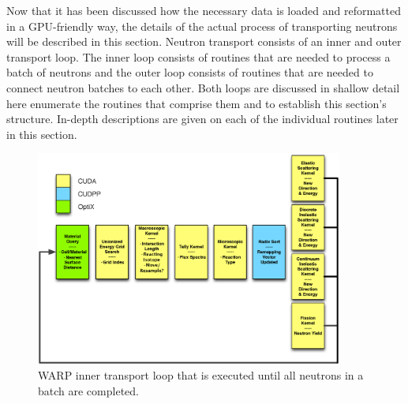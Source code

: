 Now that it has been discussed how the necessary data is loaded and reformatted in a GPU-friendly way, the details of the actual process of transporting neutrons will be described in this section.  Neutron transport consists of an inner and outer transport loop.  The inner loop consists of routines that are needed to process a batch of neutrons and the outer loop consists of routines that are needed to connect neutron batches to each other.  Both loops are discussed in shallow detail here enumerate the routines that comprise them and to establish this section's structure.  In-depth descriptions are given on each of the individual routines later in this section.

\begin{figure}[h!] 
\centering
\includegraphics[width=0.9\textwidth]{graphics/warp_inner_loop.eps}
\caption{WARP inner transport loop that is executed until all neutrons in a batch are completed. \label{warp_inner_loop} }
\end{figure}

